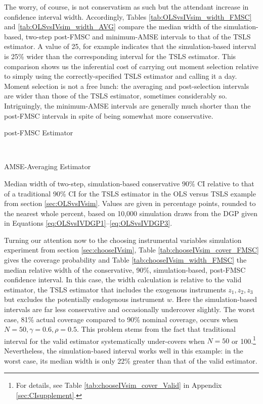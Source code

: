 The worry, of course, is not conservatism as such but the attendant increase in confidence interval width.
Accordingly, Tables \ref{tab:OLSvsIVsim_width_FMSC} and \ref{tab:OLSvsIVsim_width_AVG} compare the median width of the simulation-based, two-step post-FMSC and minimum-AMSE intervals to that of the TSLS estimator.
A value of 25, for example indicates that the simulation-based interval is 25\% wider than the corresponding interval for the TSLS estimator.
This comparison shows us the inferential cost of carrying out moment selection relative to simply using the correctly-specified TSLS estimator and calling it a day.
Moment selection is not a free lunch: the averaging and post-selection intervals are wider than those of the TSLS estimator, sometimes considerably so.
Intriguingly, the minimum-AMSE intervals are generally much shorter than the post-FMSC intervals in spite of being somewhat more conservative.

\begin{table}[h]
\footnotesize
\centering
	\begin{subtable}{0.48\textwidth}
		\caption{post-FMSC Estimator}
		
		\label{tab:OLSvsIVsim_width_FMSC}
	\end{subtable}	
	~
	\begin{subtable}{0.48\textwidth}
		\caption{AMSE-Averaging Estimator}
		
		\label{tab:OLSvsIVsim_width_AVG}
	\end{subtable}
	\caption{Median width of two-step, simulation-based conservative $90\%$ CI relative to that of a traditional 90\% CI for the TSLS estimator in the OLS versus TSLS example from section \ref{sec:OLSvsIVsim}. Values are given in percentage points, rounded to the nearest whole percent, based on 10,000 simulation draws from the DGP given in Equations \ref{eq:OLSvsIVDGP1}--\ref{eq:OLSvsIVDGP3}.}
\end{table}

Turning our attention now to the choosing instrumental variables simulation experiment from section \ref{sec:chooseIVsim}, Table \ref{tab:chooseIVsim_cover_FMSC} gives the coverage probability and Table \ref{tab:chooseIVsim_width_FMSC} the median relative width of the conservative, 90\%, simulation-based, post-FMSC confidence interval.
In this case, the width calculation is relative to the valid estimator, the TSLS estimator that includes the exogenous instruments $z_1, z_2, z_3$ but excludes the potentially endogenous instrument $w$.
Here  the simulation-based intervals are far less conservative and occasionally undercover slightly.
The worst case, 81\% actual coverage compared to 90\% nominal coverage, occurs when $N=50, \gamma = 0.6, \rho = 0.5$.
This problem stems from the fact that traditional interval for the valid estimator systematically under-covers when $N = 50$ or 100.\footnote{For details, see Table \ref{tab:chooseIVsim_cover_Valid} in Appendix \ref{sec:CIsupplement}.}
Nevertheless, the simulation-based interval works well in this example: in the worst case, its median width is only 22\% greater than that of the valid estimator.

